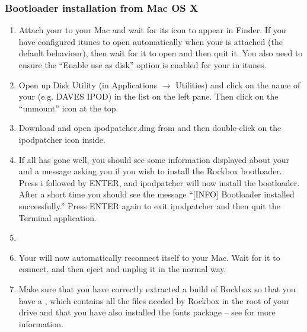 \subsubsection{Bootloader installation from Mac OS X}

\begin{enumerate}

\item Attach your \dap{} to your Mac and wait for its icon to appear in 
Finder. If you have configured itunes to open automatically when your
\dap{} is attached (the default behaviour), then wait for it to open and
then quit it. You also need to ensure the ``Enable use as disk'' option
is enabled for your \dap{} in itunes.

\item\label{subsec:macos_umount} Open up Disk Utility
(in Applications $\rightarrow$ Utilities) and click 
on the name of your \dap{} (e.g. DAVES IPOD) in the list on the left 
pane. Then click on the ``unmount'' icon at the top. 

\item Download and open ipodpatcher.dmg from 
and then double-click on the ipodpatcher icon inside. 

\item If all has gone well, you should see some 
information displayed about your \dap{} and a message asking you if you 
wish to install the Rockbox bootloader. Press i followed by ENTER, and 
ipodpatcher will now install the bootloader. After a short time you 
should see the message ``[INFO] Bootloader installed successfully.'' Press 
ENTER again to exit ipodpatcher and then quit the Terminal application.

\item {}

\item Your \dap{} will now automatically reconnect itself to your Mac. 
Wait for it to connect, and then eject and unplug it in the normal way. 

\item Make sure that you have correctly extracted a build of Rockbox so that
you have a , which contains all the files needed by Rockbox
in the root of your \daps{} drive and that you have also installed the fonts
package -- see  for more information.

\end{enumerate}

